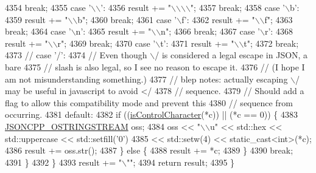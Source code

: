 \begin{DoxyCode}
4354       \textcolor{keywordflow}{break};
4355     \textcolor{keywordflow}{case} \textcolor{charliteral}{'\(\backslash\)\(\backslash\)'}:
4356       result += \textcolor{stringliteral}{"\(\backslash\)\(\backslash\)\(\backslash\)\(\backslash\)"};
4357       \textcolor{keywordflow}{break};
4358     \textcolor{keywordflow}{case} \textcolor{charliteral}{'\(\backslash\)b'}:
4359       result += \textcolor{stringliteral}{"\(\backslash\)\(\backslash\)b"};
4360       \textcolor{keywordflow}{break};
4361     \textcolor{keywordflow}{case} \textcolor{charliteral}{'\(\backslash\)f'}:
4362       result += \textcolor{stringliteral}{"\(\backslash\)\(\backslash\)f"};
4363       \textcolor{keywordflow}{break};
4364     \textcolor{keywordflow}{case} \textcolor{charliteral}{'\(\backslash\)n'}:
4365       result += \textcolor{stringliteral}{"\(\backslash\)\(\backslash\)n"};
4366       \textcolor{keywordflow}{break};
4367     \textcolor{keywordflow}{case} \textcolor{charliteral}{'\(\backslash\)r'}:
4368       result += \textcolor{stringliteral}{"\(\backslash\)\(\backslash\)r"};
4369       \textcolor{keywordflow}{break};
4370     \textcolor{keywordflow}{case} \textcolor{charliteral}{'\(\backslash\)t'}:
4371       result += \textcolor{stringliteral}{"\(\backslash\)\(\backslash\)t"};
4372       \textcolor{keywordflow}{break};
4373     \textcolor{comment}{// case '/':}
4374     \textcolor{comment}{// Even though \(\backslash\)/ is considered a legal escape in JSON, a bare}
4375     \textcolor{comment}{// slash is also legal, so I see no reason to escape it.}
4376     \textcolor{comment}{// (I hope I am not misunderstanding something.)}
4377     \textcolor{comment}{// blep notes: actually escaping \(\backslash\)/ may be useful in javascript to avoid </}
4378     \textcolor{comment}{// sequence.}
4379     \textcolor{comment}{// Should add a flag to allow this compatibility mode and prevent this}
4380     \textcolor{comment}{// sequence from occurring.}
4381     \textcolor{keywordflow}{default}:
4382       \textcolor{keywordflow}{if} ((\hyperlink{namespace_json_a0381e631737f51331065a388f4f59197}{isControlCharacter}(*c)) || (*c == 0)) \{
4383         \hyperlink{json_8h_a1d06ac2ca63c8c521f41231dfda0e6b3}{JSONCPP\_OSTRINGSTREAM} oss;
4384         oss << \textcolor{stringliteral}{"\(\backslash\)\(\backslash\)u"} << std::hex << std::uppercase << std::setfill(\textcolor{charliteral}{'0'})
4385             << std::setw(4) << \textcolor{keyword}{static\_cast<}\textcolor{keywordtype}{int}\textcolor{keyword}{>}(*c);
4386         result += oss.str();
4387       \} \textcolor{keywordflow}{else} \{
4388         result += *c;
4389       \}
4390       \textcolor{keywordflow}{break};
4391     \}
4392   \}
4393   result += \textcolor{stringliteral}{"\(\backslash\)""};
4394   \textcolor{keywordflow}{return} result;
4395 \}
\end{DoxyCode}
\mbox{\label{namespace_json_a498503e8f49d6a3811e3c9f6757da60d}} 
